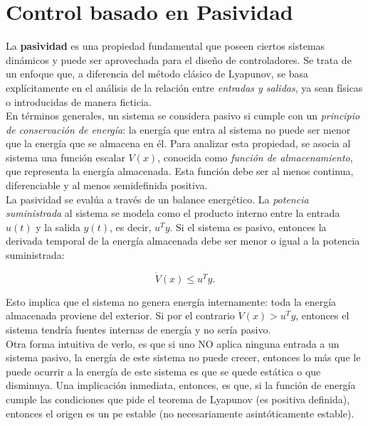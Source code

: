 \chapter{Control basado en Pasividad}
\label{chap:control-pasividad}

La \textbf{pasividad} es una propiedad fundamental que poseen ciertos sistemas dinámicos y puede ser aprovechada para el diseño de controladores. Se trata de un enfoque que, a diferencia del método clásico de Lyapunov, se basa explícitamente en el análisis de la relación entre \textit{entradas y salidas}, ya sean físicas o introducidas de manera ficticia.\\

En términos generales, un sistema se considera pasivo si cumple con un \textit{principio de conservación de energía}: la energía que entra al sistema no puede ser menor que la energía que se almacena en él. Para analizar esta propiedad, se asocia al sistema una función escalar \( V(x) \), conocida como \textit{función de almacenamiento}, que representa la energía almacenada. Esta función debe ser al menos continua, diferenciable y al menos semidefinida positiva.\\

La pasividad se evalúa a través de un balance energético. La \textit{potencia suministrada} al sistema se modela como el producto interno entre la entrada \( u(t) \) y la salida \( y(t) \), es decir, \( u^T y \). Si el sistema es pasivo, entonces la derivada temporal de la energía almacenada debe ser menor o igual a la potencia suministrada:

\begin{equation*}
	\dot{V}(x) \leq u^T y.
\end{equation*}

Esto implica que el sistema no genera energía internamente: toda la energía almacenada proviene del exterior. Si por el contrario \( \dot{V}(x) > u^T y \), entonces el sistema tendría fuentes internas de energía y no sería pasivo.\\

Otra forma intuitiva de verlo, es que si uno NO aplica ninguna entrada a un sistema pasivo, la energía de este sistema no puede crecer, entonces lo más que le puede ocurrir a la energía de este sistema es que se quede estática o que disminuya. Una implicación inmediata, entonces, es que, si la función de energía cumple las condiciones que pide el teorema de Lyapunov (es positiva definida), entonces el origen es un \gls{pe} estable (no necesariamente asintóticamente estable).

